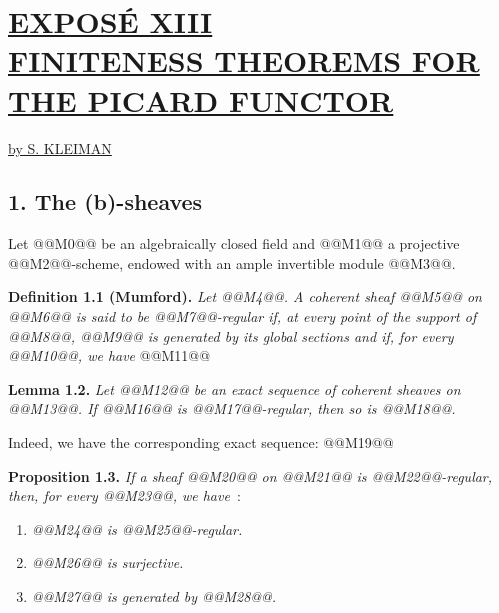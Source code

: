 \section*{\underline{EXPOS\'E XIII}\\[3pt] \underline{\underline{FINITENESS THEOREMS FOR THE PICARD FUNCTOR}}}
\begin{center}
\underline{by S. KLEIMAN}
\end{center}

\subsection*{1. The (b)-sheaves}
Let @@M0@@ be an algebraically closed field and @@M1@@ a projective @@M2@@-scheme, endowed with an ample invertible module @@M3@@.

\textbf{Definition 1.1 (Mumford).} \emph{Let @@M4@@. A coherent sheaf @@M5@@ on @@M6@@ is said to be \emph{@@M7@@-regular} if, at every point of the support of @@M8@@, @@M9@@ is generated by its global sections and if, for every @@M10@@, we have}
@@M11@@

\textbf{Lemma 1.2.} \emph{Let @@M12@@ be an exact sequence of coherent sheaves on @@M13@@}\emph{. If @@M16@@ is @@M17@@-regular, then so is @@M18@@.}

Indeed, we have the corresponding exact sequence:
@@M19@@

\textbf{Proposition 1.3.} \emph{If a sheaf @@M20@@ on @@M21@@ is @@M22@@-regular, then, for every @@M23@@, we have}~:
\begin{enumerate}[label=(\roman*)]
\item \emph{@@M24@@ is @@M25@@-regular.}
\item \emph{@@M26@@ is surjective.}
\item \emph{@@M27@@ is generated by @@M28@@.}
\end{enumerate}

